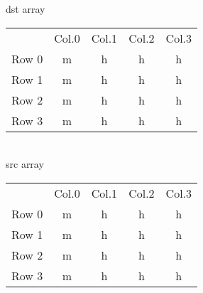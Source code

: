 \documentclass{article}
\begin{document}
\centering
dst array \\
\begin{tabular}{c c c c c}
\hline
& Col.0 & Col.1 & Col.2 & Col.3 \\
Row 0 & m & h & h & h \\
Row 1 & m & h & h & h \\
Row 2 & m & h & h & h \\
Row 3 & m & h & h & h \\
\end{tabular} \\
src array \\
\begin{tabular}{c c c c c}
\hline
& Col.0 & Col.1 & Col.2 & Col.3 \\
Row 0 & m & h & h & h \\
Row 1 & m & h & h & h \\
Row 2 & m & h & h & h \\
Row 3 & m & h & h & h \\
\end{tabular}
\end{document}
